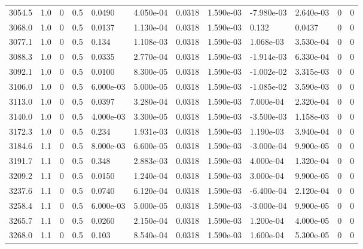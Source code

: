 \documentclass[preview]{standalone}
\begin{document}
{{{{{{{\begin{tabular}{L{1.2cm}C{1.2cm} C{0.3cm}C{0.5cm} C{1.4cm}C{1.4cm} C{1.4cm}C{1.4cm} C{1.6cm}C{1.6cm} C{1.6cm}C{1.6cm}}
  3054.5  &   1.0  & 0     & 0.5 &  0.0490  & 4.050e-04  &  0.0318&   1.590e-03& -7.980e-03 & 2.640e-03   &  0 & 0  \\ 
  3068.0  &   1.0  & 0     & 0.5 &  0.0137  & 1.130e-04  &  0.0318&   1.590e-03& 0.132 & 0.0437   &  0 & 0  \\ 
  3077.1  &   1.0  & 0     & 0.5 &  0.134  & 1.108e-03  &  0.0318&   1.590e-03& 1.068e-03 & 3.530e-04   &  0 & 0  \\ 
  3088.3  &   1.0  & 0     & 0.5 &  0.0335  & 2.770e-04  &  0.0318&   1.590e-03& -1.914e-03 & 6.330e-04   &  0 & 0  \\ 
  3092.1  &   1.0  & 0     & 0.5 &  0.0100  & 8.300e-05  &  0.0318&   1.590e-03& -1.002e-02 & 3.315e-03   &  0 & 0  \\ 
  3106.0  &   1.0  & 0     & 0.5 &  6.000e-03  & 5.000e-05  &  0.0318&   1.590e-03& -1.085e-02 & 3.590e-03   &  0 & 0  \\ 
  3113.0  &   1.0  & 0     & 0.5 &  0.0397  & 3.280e-04  &  0.0318&   1.590e-03& 7.000e-04 & 2.320e-04   &  0 & 0  \\ 
  3140.0  &   1.0  & 0     & 0.5 &  4.000e-03  & 3.300e-05  &  0.0318&   1.590e-03& -3.500e-03 & 1.158e-03   &  0 & 0  \\ 
  3172.3  &   1.0  & 0     & 0.5 &  0.234  & 1.931e-03  &  0.0318&   1.590e-03& 1.190e-03 & 3.940e-04   &  0 & 0  \\ 
  3184.6  &   1.1  & 0     & 0.5 &  8.000e-03  & 6.600e-05  &  0.0318&   1.590e-03& -3.000e-04 & 9.900e-05   &  0 & 0  \\ 
  3191.7  &   1.1  & 0     & 0.5 &  0.348  & 2.883e-03  &  0.0318&   1.590e-03& 4.000e-04 & 1.320e-04   &  0 & 0  \\ 
  3209.2  &   1.1  & 0     & 0.5 &  0.0150  & 1.240e-04  &  0.0318&   1.590e-03& 3.000e-04 & 9.900e-05   &  0 & 0  \\ 
  3237.6  &   1.1  & 0     & 0.5 &  0.0740  & 6.120e-04  &  0.0318&   1.590e-03& -6.400e-04 & 2.120e-04   &  0 & 0  \\ 
  3258.4  &   1.1  & 0     & 0.5 &  6.000e-03  & 5.000e-05  &  0.0318&   1.590e-03& -3.000e-04 & 9.900e-05   &  0 & 0  \\ 
  3265.7  &   1.1  & 0     & 0.5 &  0.0260  & 2.150e-04  &  0.0318&   1.590e-03& 1.200e-04 & 4.000e-05   &  0 & 0  \\ 
  3268.0  &   1.1  & 0     & 0.5 &  0.103  & 8.540e-04  &  0.0318&   1.590e-03& 1.600e-04 & 5.300e-05   &  0 & 0  \\ 
\hline 
\end{tabular} 

}}}}}}}
\end{document}
